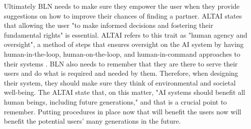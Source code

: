 \documentclass[a4paper,10pt]{article}
\begin{document}
	Ultimately BLN needs to make sure they empower the user when they provide suggestions on how to improve their chances of finding a partner. ALTAI states that allowing the user "to make informed decisions and fostering their fundamental rights" \cite{ALTAI_ws} is essential. ALTAI refers to this trait as "human agency and oversight", a method of steps that ensures oversight on the AI system by having human-in-the-loop, human-on-the-loop, and human-in-command approaches to their systems \cite{ALTAI_ws}. BLN also needs to remember that they are there to serve their users and do what is required and needed by them. Therefore, when designing their system, they should make sure they think of environmental and societal well-being. The ALTAI state that, on this matter, "AI systems should benefit all human beings, including future generations," and that is a crucial point to remember. Putting procedures in place now that will benefit the users now will benefit the potential users' many generations in the future. 
	
\medskip
\newpage
	
	

\newpage



\end{document}
